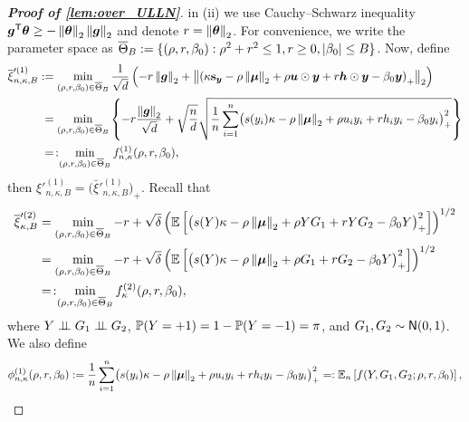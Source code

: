 \begin{proof}[\textbf{Proof of \cref{lem:over_ULLN}}]
in (ii) we use Cauchy--Schwarz inequality $\vg^\top \btheta \ge - \norm{\vtheta}_2 \norm{\vg}_2$ and denote $r = \norm{\vtheta}_2$. For convenience, we write the parameter space as $\bar\Theta_{B} := \{ (\rho, r, \beta_0): \rho^2 + r^2 \le 1, r \ge 0, \abs{\beta_0} \le B \}$. Now, define
\begin{align*}
        \bar \xi'^{(1)}_{n, \kappa, B} & := \min_{ (\rho, r, \beta_0) \in \bar\Theta_{B} } \frac{1}{\sqrt{d}} \left( 
            - r \norm{\vg}_2 + \bigl\| \left( 
            \kappa \bs_\yy - \rho \norm{\bmu}_2 + \rho \uu \odot \yy
        + r \vh \odot \yy - \beta_0 \yy
         \right)_+ \bigr\|_2  \right) \\
         & \phantom{:}= 
         \min_{ (\rho, r, \beta_0) \in \bar\Theta_{B} }
         \left\{ 
            -r\frac{\norm{\vg}_2}{\sqrt{d}}
            + \sqrt{\frac{n}{d}} \sqrt{\frac{1}{n} \sum_{i=1}^n \bigl( s(y_i) \kappa - \rho \norm{\bmu}_2 + \rho u_i y_i
            + r h_i y_i - \beta_0 y_i \bigr)_+^2 }
         \right\}
         \\
         & \phantom{:} =\mathmakebox[0pt][c]{:} \min_{ (\rho, r, \beta_0) \in \bar\Theta_{B} } f^{(1)}_{n,\kappa}(\rho,r,\beta_0)  ,
\end{align*}
then $\xi'^{(1)}_{n, \kappa, B} = \bigl( \bar \xi'^{(1)}_{n, \kappa, B} \bigr)_+$. Recall that
\begin{align*}
        \bar\xi'^{(2)}_{\kappa, B} & = \min_{ (\rho, r, \beta_0) \in \bar\Theta_{B} }
    -r + \sqrt{\delta} \left( \E\left[ \bigl(  s(Y) \kappa - \rho \norm{\bmu}_2 + \rho Y G_1 + r Y G_2 - \beta_0 Y \bigr)_+^2 \right] \right)^{1/2} \\
    & = \min_{ (\rho, r, \beta_0) \in \bar\Theta_{B} }
    -r + \sqrt{\delta} \left( \E\left[ \bigl(  s(Y) \kappa - \rho \norm{\bmu}_2 + \rho G_1 + r G_2 - \beta_0 Y \bigr)_+^2 \right] \right)^{1/2} \\
    & =\mathmakebox[0pt][c]{:} \min_{ (\rho, r, \beta_0) \in \bar\Theta_{B} } f^{(2)}_{\kappa}(\rho,r,\beta_0),
\end{align*}
where $Y \indep G_1 \indep G_2$, $\P(Y = +1) = 1 - \P(Y = -1) = \pi$, and $G_1, G_2 \sim \normal(0, 1)$.
We also define
\begin{equation*}
    \begin{aligned}
        \phi^{(1)}_{n, \kappa}(\rho, r, \beta_0) & := \frac1n \sum_{i=1}^n \bigl( s(y_i) \kappa - \rho \norm{\bmu}_2 + \rho u_i y_i
        + r h_i y_i - \beta_0 y_i \bigr)_+^2
        = : \E_n\left[ f(Y, G_1, G_2; \rho, r, \beta_0) \right] , \\

\end{aligned}
\end{equation*}
\end{proof}
